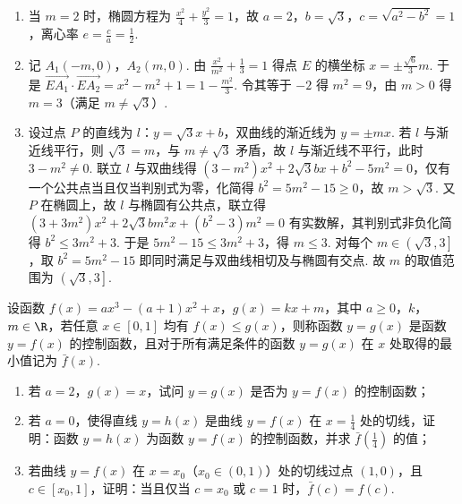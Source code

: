 \begin{solution}
\begin{enumerate}
\item 当 \(m=2\) 时，椭圆方程为 \(\frac{x^2}{4}+\frac{y^2}{3}=1\)，故 \(a=2\)，\(b=\sqrt3\)，\(c=\sqrt{a^2-b^2}=1\)，离心率 \(e=\frac{c}{a}=\frac{1}{2}\).
\item 记 \(A_1\left(-m,0\right)\)，\(A_2\left(m,0\right)\). 由 \(\frac{x^2}{m^2}+\frac{1}{3}=1\) 得点 \(E\) 的横坐标 \(x=\pm\frac{\sqrt6}{3}m\). 于是 \(\overrightarrow{EA_1}\cdot\overrightarrow{EA_2}=x^2-m^2+1=1-\frac{m^2}{3}\). 令其等于 \(-2\) 得 \(m^2=9\)，由 \(m>0\) 得 \(m=3\)（满足 \(m\neq\sqrt3\)）.
\item 设过点 \(P\) 的直线为 \(l\)：\(y=\sqrt3x+b\)，双曲线的渐近线为 \(y=\pm mx\). 若 \(l\) 与渐近线平行，则 \(\sqrt3=m\)，与 \(m\neq\sqrt3\) 矛盾，故 \(l\) 与渐近线不平行，此时 \(3-m^2\neq0\). 联立 \(l\) 与双曲线得 \(\left(3-m^2\right)x^2+2\sqrt3bx+b^2-5m^2=0\)，仅有一个公共点当且仅当判别式为零，化简得 \(b^2=5m^2-15\geqslant0\)，故 \(m>\sqrt3\). 又 \(P\) 在椭圆上，故 \(l\) 与椭圆有公共点，联立得 \(\left(3+3m^2\right)x^2+2\sqrt3bm^2x+\left(b^2-3\right)m^2=0\) 有实数解，其判别式非负化简得 \(b^2\leqslant3m^2+3\). 于是 \(5m^2-15\leqslant3m^2+3\)，得 \(m\leqslant3\). 对每个 \(m\in\left(\sqrt3,3\right]\)，取 \(b^2=5m^2-15\) 即同时满足与双曲线相切及与椭圆有交点. 故 \(m\) 的取值范围为 \(\left(\sqrt3,3\right]\).
\end{enumerate}
\end{solution}

\begin{problem}
设函数 \(f(x)=ax^3-(a+1)x^2+x\)，\(g(x)=kx+m\)，其中 \(a\ge 0\)，\(k\)，\(m\in \R\)，若任意 \(x\in[0,1]\) 均有 \(f(x)\le g(x)\)，则称函数 \(y=g(x)\) 是函数 \(y=f(x)\) 的控制函数，且对于所有满足条件的函数 \(y=g(x)\) 在 \(x\) 处取得的最小值记为 \(\bar f(x)\).

\begin{enumerate}
\item 若 \(a=2\)，\(g(x)=x\)，试问 \(y=g(x)\) 是否为 \(y=f(x)\) 的控制函数；
\item 若 \(a=0\)，使得直线 \(y=h(x)\) 是曲线 \(y=f(x)\) 在 \(x=\frac14\) 处的切线，证明：函数 \(y=h(x)\) 为函数 \(y=f(x)\) 的控制函数，并求 \(\bar f\left(\frac14\right)\) 的值；
\item 若曲线 \(y=f(x)\) 在 \(x=x_0\)（\(x_0\in(0,1)\)）处的切线过点 \((1,0)\)，且 \(c\in[x_0,1]\)，证明：当且仅当 \(c=x_0\) 或 \(c=1\) 时，\(\bar f(c)=f(c)\).
\end{enumerate}
\end{problem}

